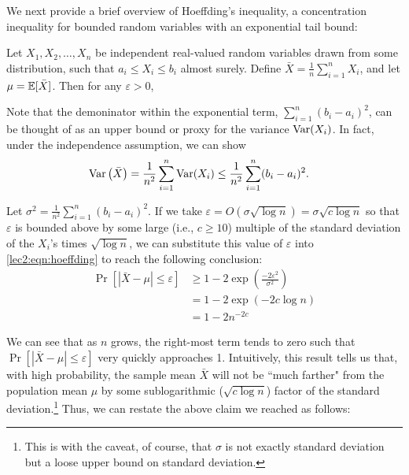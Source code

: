 \label{lec2:subsec:hoeffding}

We next provide a brief overview of Hoeffding's inequality, a concentration inequality for bounded random variables with an exponential tail bound:

\begin{theorem}
    Let $X_1, X_2, \dots, X_n$ be independent real-valued random variables drawn from some distribution, such that $a_i \leq X_i \leq b_i$ almost surely. Define $\bar{X} = \frac{1}{n}\sum_{i=1}^n X_i$, and let $\mu = \operatorname*{\mathbb{E}} [\bar{X}]$. Then for any $\varepsilon > 0$,
\end{theorem}

Note that the demoninator within the exponential term, $\sum_{i=1}^n (b_i - a_i)^2$, can be thought of as an upper bound or proxy for the variance $\operatorname{Var}(X_i)$. In fact, under the independence assumption, we can show
\begin{align}
    \operatorname{Var}\left(\bar{X} \right) &= \frac{1}{n^2}\sum_{i=1}^n \operatorname{Var}(X_i) \leq \frac{1}{n^2}\sum_{i=1}^n (b_i - a_i)^2.
\end{align}

Let $\sigma^2 = \frac{1}{n^2}\sum_{i=1}^n (b_i - a_i)^2$. If we take $\varepsilon = O(\sigma \sqrt{\log{n}}) = \sigma \sqrt{c \log n}$ so that $\varepsilon$ is bounded above by some large (i.e., $c \geq 10$) multiple of the standard deviation of the $X_i$'s times $\sqrt{\log{n}}$, we can substitute this value of $\varepsilon$ into \eqref{lec2:eqn:hoeffding} to reach the following conclusion: 
\begin{align}
    \Pr \left[ |\bar{X} - \mu| \leq \varepsilon \right] &\geq 1 - 2\exp\left(\frac{-2 \varepsilon^2}{\sigma^2}\right)\\
    &= 1 - 2 \exp(-2 c \log n)\\
    &= 1 - 2 n^{-2c}
\end{align}

We can see that as $n$ grows, the right-most term tends to zero such that $\Pr[|\bar{X} - \mu| \leq \varepsilon]$ very quickly approaches 1. Intuitively, this result tells us that, with high probability, the sample mean $\bar{X}$ will not be ``much farther" from the population mean $\mu$ by some sublogarithmic ($\sqrt{c \log n}$) factor of the standard deviation.\footnote{This is with the caveat, of course, that $\sigma$ is not exactly standard deviation but a loose upper bound on standard deviation.} Thus, we can restate the above claim we reached as follows:

